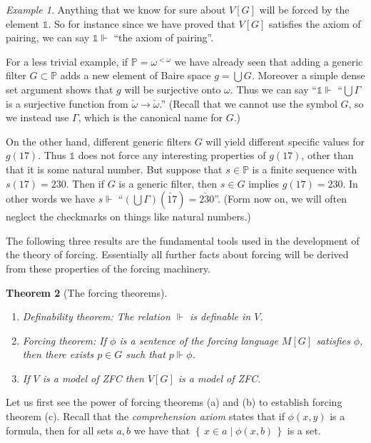 \documentclass[11pt,oneside]{amsbook}
\newcommand{\set}[1]{\left\{\,#1\,\right\}}
\newcommand{\forces}{\Vdash}
\theoremstyle{definition}
\theoremstyle{plain}
\newtheorem{thm}{Theorem}[section]
\theoremstyle{definition}
\theoremstyle{remark}
\newtheorem{example}[thm]{Example}
\begin{document}
\begin{example}
  Anything that we know for sure about $V[G]$ will be forced by the element $\mathbb 1$. So for instance since we have proved that $V[G]$ satisfies the axiom of pairing, we can say $\mathbb 1\forces$ ``the axiom of pairing''.

  For a less trivial example, if $\mathbb P=\omega^{<\omega}$ we have already seen that adding a generic filter $G\subset\mathbb P$ adds a new element of Baire space $g=\bigcup G$. Moreover a simple dense set argument shows that $g$ will be surjective onto $\omega$. Thus we can say ``$\mathbb 1\forces$ ``$\bigcup\Gamma$ is a surjective function from $\check\omega\to\check\omega$.'' (Recall that we cannot use the symbol $G$, so we instead use $\Gamma$, which is the canonical name for $G$.)

  On the other hand, different generic filters $G$ will yield different specific values for $g(17)$. Thus $\mathbb 1$ does not force any interesting properties of $g(17)$, other than that it is some natural number. But suppose that $s\in\mathbb P$ is a finite sequence with $s(17)=230$. Then if $G$ is a generic filter, then $s\in G$ implies $g(17)=230$. In other words we have $s\forces$ ``$(\bigcup\Gamma)(\check{17})=\check{230}$''. (Form now on, we will often neglect the checkmarks on things like natural numbers.)
\end{example}

The following three results are the fundamental tools used in the development of the theory of forcing. Essentially all further facts about forcing will be derived from these properties of the forcing machinery.

\begin{thm}[The forcing theorems]\
\label{thm:forcing}
\begin{enumerate}
\item \textup{Definability theorem}: The relation $\Vdash$ is definable in $V$.
\item \textup{Forcing theorem}: If $\phi$ is a sentence of the forcing language $M[G]$ satisfies $\phi$, then there exists $p\in G$ such that $p\Vdash\phi$.
\item If $V$ is a model of ZFC then $V[G]$ is a model of ZFC.
\end{enumerate}
\end{thm}

Let us first see the power of forcing theorems (a) and (b) to establish forcing theorem (c). Recall that the \emph{comprehension axiom} states that if $\phi(x,y)$ is a formula, then for all sets $a,b$ we have that $\set{x\in a\mid\phi(x,b)}$ is a set.
\end{document}
